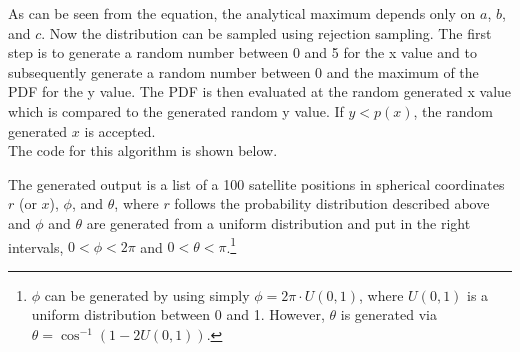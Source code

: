 As can be seen from the equation, the analytical maximum depends only on $a$, $b$, and $c$. Now the distribution can be sampled using rejection sampling. The first step is to generate a random number between 0 and 5 for the x value and to subsequently generate a random number between 0 and the maximum of the PDF for the y value. The PDF is then evaluated at the random generated x value which is compared to the generated random y value. If $y<p(x)$, the random generated $x$ is accepted. \\
The code for this algorithm is shown below.


The generated output is a list of a 100 satellite positions  in spherical coordinates $r$ (or $x$), $\phi$, and $\theta$, where $r$ follows the probability distribution described above and $\phi$ and $\theta$ are generated from a uniform distribution and put in the right intervals, $0<\phi<2\pi$ and $0<\theta<\pi$.\footnote{$\phi$ can be generated by using simply $\phi = 2\pi\cdot U(0,1)$, where $U(0,1)$ is a uniform distribution between 0 and 1. However, $\theta$ is generated via $\theta= \cos^{-1}(1-2U(0,1))$.}
